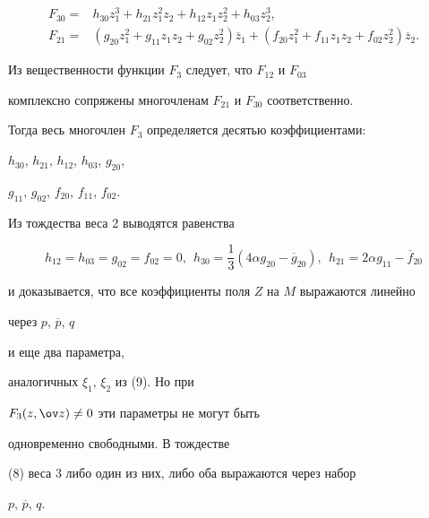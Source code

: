 \begin{align*}


F_{30} =&


 h_{30} z_1^3 + h_{21} z_1^2 z_2 + h_{12} z_1 z_2^2 + h_{03} z_2^3, \\


F_{21} = &


 (g_{20} z_1^2 + g_{11} z_1 z_2 + g_{02} z_2^2) \overline z_1 +


 (f_{20} z_1^2 + f_{11} z_1 z_2 + f_{02} z_2^2) \overline z_2.


\end{align*}





Из вещественности функции $ F_3 $ следует, что $ F_{12} $ и $ F_{03} $ 


комплексно сопряжены многочленам $ F_{21} $ и $ F_{30} $ соответственно.


Тогда весь многочлен $ F_3 $ определяется десятью коэффициентами:


$h_{30}$, $h_{21}$, $h_{12}$, $h_{03}$, $g_{20}$,


$g_{11}$, $g_{02}$, $f_{20}$, $f_{11}$, $f_{02}$. 





Из тождества веса 2 выводятся равенства


$$


 h_{12} = h_{03} = g_{02} = f_{02} = 0, \ \


 h_{30} = \frac13 ( 4 \alpha g_{20} - \overline g_{20}), 


\ \


 h_{21} = 2 \alpha g_{11} - \overline f_{20}


$$


и доказывается, что все коэффициенты поля $ Z $ на $ M $ выражаются линейно


через $ p$, $\overline p$, $q $ 


и еще два параметра,


аналогичных $ \xi_1$, $\xi_2 $ из (9). Но при


$ F_3(z,\ov z) \ne 0 $ эти параметры не могут быть 


одновременно свободными. В тождестве


(8) веса 3 либо один из них, либо оба выражаются через набор 


$ p$, $\overline p$, $q $.





